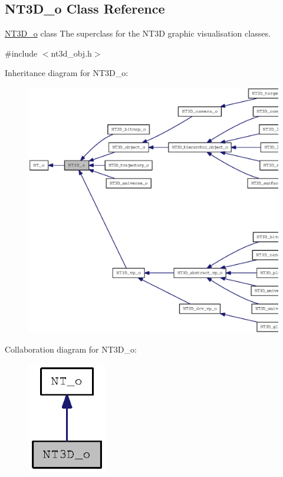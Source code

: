 \subsection{NT3D\_\-o Class Reference}
\label{class_n_t3_d__o}


\hyperlink{class_n_t3_d__o}{NT3D\_\-o} class The superclass for the NT3D graphic visualisation classes.  




{\ttfamily \#include $<$nt3d\_\-obj.h$>$}



Inheritance diagram for NT3D\_\-o:
\nopagebreak
\begin{figure}[H]
\begin{center}
\leavevmode
\includegraphics[width=400pt]{class_n_t3_d__o__inherit__graph}
\end{center}
\end{figure}


Collaboration diagram for NT3D\_\-o:
\nopagebreak
\begin{figure}[H]
\begin{center}
\leavevmode
\includegraphics[width=98pt]{class_n_t3_d__o__coll__graph}
\end{center}
\end{figure}
